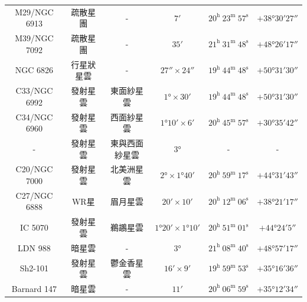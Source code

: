 \begin{center}
\begin{longtable}{c | c | c | c | c | c}
    M29/NGC 6913 & 疏散星團 & - & \(\ang{;7;}\) & \(20^\text{h }23^\text{m }57^\text{s}\) & \(+\ang{38;30;27}\) \\ %
    M39/NGC 7092 & 疏散星團 & - & \(\ang{;35;}\) & \(21^\text{h }31^\text{m }48^\text{s}\) & \(+\ang{48;26;17}\) \\ %
    NGC 6826 & 行星狀星雲 & - & \(\ang{;;27}\times\ang{;;24}\) & \(19^\text{h }44^\text{m }48^\text{s}\) & \(+\ang{50;31;30}\) \\ %
    C33/NGC 6992 & 發射星雲 & 東面紗星雲 & \(\ang{1;;}\times\ang{;30;}\) & \(19^\text{h }44^\text{m }48^\text{s}\) & \(+\ang{50;31;30}\) \\ %
    C34/NGC 6960 & 發射星雲 & 西面紗星雲 & \(\ang{1;10;}\times\ang{;6;}\) & \(20^\text{h }45^\text{m }57^\text{s}\) & \(+\ang{30;35;42}\) \\ %
    - & 發射星雲 & 東與西面紗星雲 & \(\ang{3;;}\) & - & - \\ %
    C20/NGC 7000 & 發射星雲 & 北美洲星雲 & \(\ang{2;;}\times\ang{1;40;}\) & \(20^\text{h }59^\text{m }17^\text{s}\) & \(+\ang{44;31;43}\) \\ %
    C27/NGC 6888 & WR星 & 眉月星雲 & \(\ang{;20;}\times\ang{;10;}\) & \(20^\text{h }12^\text{m }06^\text{s}\) & \(+\ang{38;21;17}\) \\ %
    IC 5070 & 發射星雲 & 鵜鶘星雲 & \(\ang{1;20;}\times\ang{1;10;}\) & \(20^\text{h }51^\text{m }01^\text{s}\) & \(+\ang{44;24;5}\) \\ %
    LDN 988 & 暗星雲 & - & \(\ang{3;;}\) & \(21^\text{h }08^\text{m }40^\text{s}\) & \(+\ang{48;57;17}\) \\ %
    Sh2-101 & 發射星雲 & 鬱金香星雲 & \(\ang{;16;}\times\ang{;9;}\) & \(19^\text{h }59^\text{m }53^\text{s}\) & \(+\ang{35;16;36}\) \\ %
    Barnard 147 & 暗星雲 & - & \(\ang{;11;}\) & \(20^\text{h }06^\text{m }59^\text{s}\) & \(+\ang{35;12;34}\) \\
\end{longtable}
\end{center}

